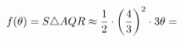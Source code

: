 \documentclass[preview]{standalone}
\begin{document}
\begin{align*}
f( \theta ) = S \triangle AQR \approx {1 \over 2} \cdot \left( {4 \over 3} \right) ^2 \cdot 3 \theta =
\end{align*}
\end{document}
